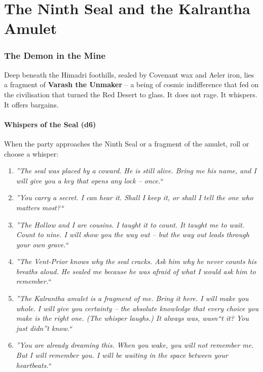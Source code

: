 \documentclass[12pt,oneside]{book}
\begin{document}
\chapter{The Ninth Seal and the Kalrantha Amulet}

\subsection*{The Demon in the Mine}
Deep beneath the Himadri foothills, sealed by Covenant wax and Aeler iron, lies a fragment of \textbf{Varash the Unmaker} -- a being of cosmic indifference that fed on the civilisation that turned the Red Desert to glass. It does not rage. It whispers. It offers bargains.

\subsubsection*{Whispers of the Seal (d6)}
When the party approaches the Ninth Seal or a fragment of the amulet, roll or choose a whisper:
\begin{enumerate}
  \item \textit{''The seal was placed by a coward. He is still alive. Bring me his name, and I will give you a key that opens any lock -- once.``}
  \item \textit{''You carry a secret. I can hear it. Shall I keep it, or shall I tell the one who matters most?``}
  \item \textit{''The Hollow and I are cousins. I taught it to count. It taught me to wait. Count to nine. I will show you the way out -- but the way out leads through your own grave.``}
  \item \textit{''The Vent-Prior knows why the seal cracks. Ask him why he never counts his breaths aloud. He sealed me because he was afraid of what I would ask him to remember.``}
  \item \textit{''The Kalrantha amulet is a fragment of me. Bring it here. I will make you whole. I will give you certainty -- the absolute knowledge that every choice you make is the right one. (The whisper laughs.) It always was, wasn``t it? You just didn''t know.``}
  \item \textit{''You are already dreaming this. When you wake, you will not remember me. But I will remember you. I will be waiting in the space between your heartbeats.``}
\end{enumerate}
\end{document}
